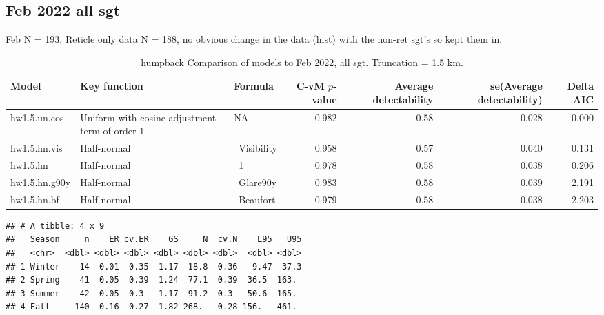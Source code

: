 \documentclass[
]{article}
\begin{document}
\hypertarget{feb-2022-all-sgt}{%
\subsection{Feb 2022 all sgt}\label{feb-2022-all-sgt}}

Feb N = 193, Reticle only data N = 188, no obvious change in the data
(hist) with the non-ret sgt's so kept them in.

\begin{landscape}\begin{table}

\caption{\label{tab:feb-all-sgt}humpback  Comparison of models to Feb 2022, all sgt. Truncation = 1.5 km.}
\centering
\begin{tabular}[t]{l|l|l|r|r|r|r}
\hline
Model & Key function & Formula & C-vM $p$-value & Average detectability & se(Average detectability) & Delta AIC\\
\hline
hw1.5.un.cos & Uniform with cosine adjustment term of order 1 & NA & 0.982 & 0.58 & 0.028 & 0.000\\
\hline
hw1.5.hn.vis & Half-normal & ~Visibility & 0.958 & 0.57 & 0.040 & 0.131\\
\hline
hw1.5.hn & Half-normal & ~1 & 0.978 & 0.58 & 0.038 & 0.206\\
\hline
hw1.5.hn.g90y & Half-normal & ~Glare90y & 0.983 & 0.58 & 0.039 & 2.191\\
\hline
hw1.5.hn.bf & Half-normal & ~Beaufort & 0.979 & 0.58 & 0.038 & 2.203\\
\hline
\end{tabular}
\end{table}
\end{landscape}

\begin{verbatim}
## # A tibble: 4 x 9
##   Season     n    ER cv.ER    GS     N  cv.N    L95   U95
##   <chr>  <dbl> <dbl> <dbl> <dbl> <dbl> <dbl>  <dbl> <dbl>
## 1 Winter    14  0.01  0.35  1.17  18.8  0.36   9.47  37.3
## 2 Spring    41  0.05  0.39  1.24  77.1  0.39  36.5  163. 
## 3 Summer    42  0.05  0.3   1.17  91.2  0.3   50.6  165. 
## 4 Fall     140  0.16  0.27  1.82 268.   0.28 156.   461.
\end{verbatim}
\end{document}
